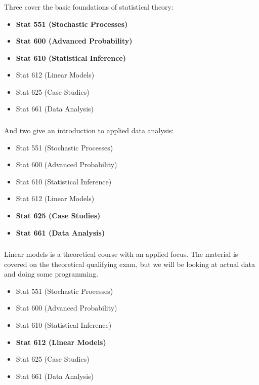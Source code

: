 \begin{frame}[fragile] \frametitle{}

Three cover the basic foundations of statistical theory:

\begin{itemize}
\item {\color{solarized@red} \bf Stat 551 (Stochastic Processes)}
\item {\color{solarized@red} \bf Stat 600 (Advanced Probability)}
\item {\color{solarized@red} \bf Stat 610 (Statistical Inference)}
\item Stat 612 (Linear Models)
\item Stat 625 (Case Studies)
\item Stat 661 (Data Analysis)
\end{itemize}

\end{frame}

\begin{frame}[fragile] \frametitle{}

And two give an introduction to applied data analysis:

\begin{itemize}
\item Stat 551 (Stochastic Processes)
\item Stat 600 (Advanced Probability)
\item Stat 610 (Statistical Inference)
\item Stat 612 (Linear Models)
\item {\color{solarized@cyan} \bf Stat 625 (Case Studies)}
\item {\color{solarized@cyan} \bf Stat 661 (Data Analysis)}
\end{itemize}

\end{frame}

\begin{frame}[fragile] \frametitle{}

Linear models is a theoretical course with an applied focus.
The material is covered on the theoretical qualifying exam,
but we will be looking at actual data and doing some programming.

\begin{itemize}
\item Stat 551 (Stochastic Processes)
\item Stat 600 (Advanced Probability)
\item Stat 610 (Statistical Inference)
\item {\color{solarized@violet} \bf Stat 612 (Linear Models)}
\item Stat 625 (Case Studies)
\item Stat 661 (Data Analysis)
\end{itemize}

\end{frame}

